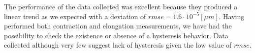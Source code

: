 The performance of the data collected was excellent because they produced a linear trend as we expected with a deviation of $rmse = 1.6 \cdot 10^{-5}[\mu m]$. Having performed both contraction and elongation measurements, we have had the possibility to check the existence or absence of a hysteresis behavior. Data collected although very few suggest lack of hysteresis given the low value of $rmse$.


